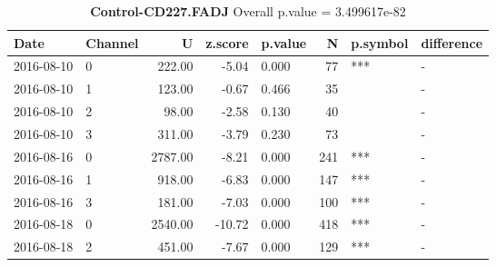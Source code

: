 \begin{table}[ht]
\caption[Control-CD227.FADJ]{\textbf{Control-CD227.FADJ} Overall p.value = 3.499617e-82}
\centering
\begin{tabular}{llrrlrll}
  \hline
Date & Channel & U & z.score & p.value & N & p.symbol & difference \\ 
  \hline
2016-08-10 & 0 & 222.00 & -5.04 & 0.000 &  77 & *** & - \\ 
  2016-08-10 & 1 & 123.00 & -0.67 & 0.466 &  35 &  & - \\ 
  2016-08-10 & 2 & 98.00 & -2.58 & 0.130 &  40 &  & - \\ 
  2016-08-10 & 3 & 311.00 & -3.79 & 0.230 &  73 &  & - \\ 
  2016-08-16 & 0 & 2787.00 & -8.21 & 0.000 & 241 & *** & - \\ 
  2016-08-16 & 1 & 918.00 & -6.83 & 0.000 & 147 & *** & - \\ 
  2016-08-16 & 3 & 181.00 & -7.03 & 0.000 & 100 & *** & - \\ 
  2016-08-18 & 0 & 2540.00 & -10.72 & 0.000 & 418 & *** & - \\ 
  2016-08-18 & 2 & 451.00 & -7.67 & 0.000 & 129 & *** & - \\ 
   \hline
\end{tabular}
\end{table}
